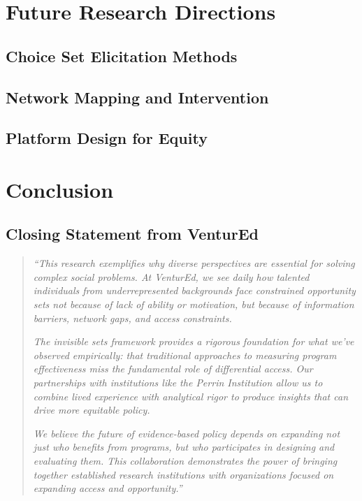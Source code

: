 \documentclass[11pt,letterpaper]{report}
\theoremstyle{definition}
\theoremstyle{remark}
\begin{document}
\chapter{Future Research Directions}
\lipsum[1-2]

\section{Choice Set Elicitation Methods}
\lipsum[3]

\section{Network Mapping and Intervention}
\lipsum[4]

\section{Platform Design for Equity}
\lipsum[5]

\chapter{Conclusion}
\lipsum[1-3]

\section*{Closing Statement from VenturEd}

\begin{quote}
\textit{``This research exemplifies why diverse perspectives are essential for solving complex social problems. At VenturEd, we see daily how talented individuals from underrepresented backgrounds face constrained opportunity sets not because of lack of ability or motivation, but because of information barriers, network gaps, and access constraints.}

\textit{The invisible sets framework provides a rigorous foundation for what we've observed empirically: that traditional approaches to measuring program effectiveness miss the fundamental role of differential access. Our partnerships with institutions like the Perrin Institution allow us to combine lived experience with analytical rigor to produce insights that can drive more equitable policy.}

\textit{We believe the future of evidence-based policy depends on expanding not just who benefits from programs, but who participates in designing and evaluating them. This collaboration demonstrates the power of bringing together established research institutions with organizations focused on expanding access and opportunity.''}
\end{quote}
\end{document}
